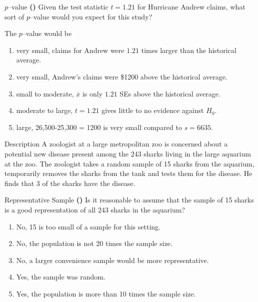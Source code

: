\documentclass[13pt]{beamer}
\newcounter{count}
\newcommand{\question}{ \textbf{(\decimal{count})} \stepcounter{count}}
\begin{document}
\begin{frame}{$p$--value}
\question Given the test statistic $t=1.21$ for Hurricane Andrew claims, what sort of $p$--value would you expect for this study?

The $p$--value would be
\begin{enumerate}[A]
   \item very small, claims for Andrew were $1.21$ times larger than the historical average.
   \item very small, Andrew's claims were \$1200 above the historical average.
   \item small to moderate, $\overline{x}$ is only $1.21$ SEs above the historical average.%
   \item moderate to large, $t=1.21$ gives little to no evidence against $H_0$.
   \item large, 26,500-25,300 = 1200 is very small compared to $s=6635$.
\end{enumerate}
\end{frame}

\begin{frame}{Description}
%
%
A zoologist at a large metropolitan zoo is concerned about a potential new disease present among the 243
sharks living in the large aquarium at the zoo. The zoologist takes a random sample of 15 sharks from the
aquarium, temporarily removes the sharks from the tank and tests them for the disease. He finds that 3 of
the sharks have the disease.
\end{frame}

\begin{frame}{Representative Sample}
\question Is it reasonable to assume that the sample of 15 sharks is a good representation of all 243 sharks in the aquarium?
\begin{enumerate}[A]
   \item No, 15 is too small of a sample for this setting.
   \item No, the population is not 20 times the sample size.
   \item No, a larger convenience sample would be more representative.
   \item Yes, the sample was random.%
   \item Yes, the population is more than 10 times the sample size.
\end{enumerate}
\end{frame}
\end{document}
